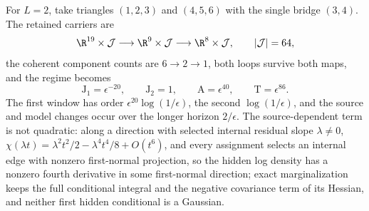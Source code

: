 For \(L=2\), take triangles \((1,2,3)\) and \((4,5,6)\) with the single bridge
\((3,4)\). The retained carriers are
\begin{equation}
\R^{19}\times\mathcal J
\longrightarrow\R^9\times\mathcal J
\longrightarrow\R^8\times\mathcal J,
\qquad |\mathcal J|=64,
\label{eq:rg-formation-two-triangle-carrier}
\end{equation}
the coherent component counts are \(6\to2\to1\), both loops survive both
maps, and the regime becomes
\begin{equation}
\mathrm J_1=\epsilon^{-20},\qquad \mathrm J_2=1,\qquad
\mathrm A=\epsilon^{40},\qquad \mathrm T=\epsilon^{86}.
\label{eq:rg-formation-two-triangle-regime}
\end{equation}
The first window has order \(\epsilon^{20}\log(1/\epsilon)\), the second
\(\log(1/\epsilon)\), and the source and model changes occur over the longer
horizon \(2/\epsilon\). The source-dependent term is not quadratic: along a
direction with selected internal residual slope \(\lambda\ne0\),
\(\chi(\lambda t)=\lambda^2t^2/2-\lambda^4t^4/8+O(t^6)\), and every assignment
selects an internal edge with nonzero first-normal projection, so the hidden
log density has a nonzero fourth derivative in some first-normal direction;
exact marginalization keeps the full conditional integral and the negative
covariance term of its Hessian, and neither first hidden conditional is a
Gaussian. 

